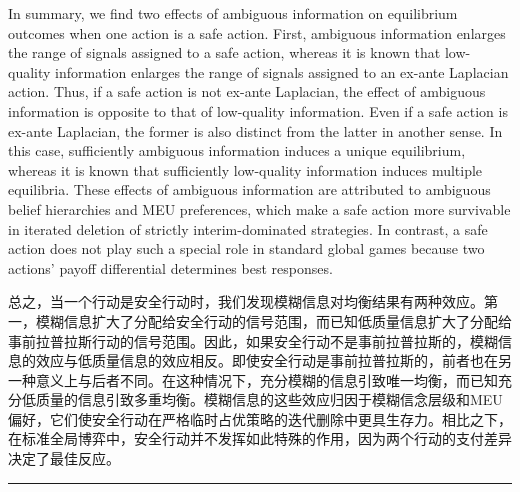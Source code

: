 \documentclass[12pt,a4paper]{article}
\newenvironment{original}
  {\par\medskip\noindent\color{black}\ignorespaces}
  {\par\medskip}
\newenvironment{translation}
  {\par\noindent\color{darkblue}\ignorespaces}
  {\par\medskip\noindent\hrule\par\medskip}
\theoremstyle{definition}
\theoremstyle{remark}
\begin{document}
\begin{original}
In summary, we find two effects of ambiguous information on equilibrium outcomes when one action is a safe action. First, ambiguous information enlarges the range of signals assigned to a safe action, whereas it is known that low-quality information enlarges the range of signals assigned to an ex-ante Laplacian action. Thus, if a safe action is not ex-ante Laplacian, the effect of ambiguous information is opposite to that of low-quality information. Even if a safe action is ex-ante Laplacian, the former is also distinct from the latter in another sense. In this case, sufficiently ambiguous information induces a unique equilibrium, whereas it is known that sufficiently low-quality information induces multiple equilibria. These effects of ambiguous information are attributed to ambiguous belief hierarchies and MEU preferences, which make a safe action more survivable in iterated deletion of strictly interim-dominated strategies. In contrast, a safe action does not play such a special role in standard global games because two actions' payoff differential determines best responses.
\end{original}
\begin{translation}
总之，当一个行动是安全行动时，我们发现模糊信息对均衡结果有两种效应。第一，模糊信息扩大了分配给安全行动的信号范围，而已知低质量信息扩大了分配给事前拉普拉斯行动的信号范围。因此，如果安全行动不是事前拉普拉斯的，模糊信息的效应与低质量信息的效应相反。即使安全行动是事前拉普拉斯的，前者也在另一种意义上与后者不同。在这种情况下，充分模糊的信息引致唯一均衡，而已知充分低质量的信息引致多重均衡。模糊信息的这些效应归因于模糊信念层级和MEU偏好，它们使安全行动在严格临时占优策略的迭代删除中更具生存力。相比之下，在标准全局博弈中，安全行动并不发挥如此特殊的作用，因为两个行动的支付差异决定了最佳反应。
\end{translation}
\end{document}
